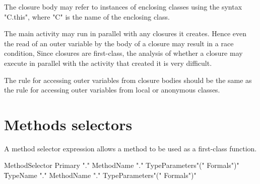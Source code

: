 The closure body may refer to instances of enclosing classes using
the syntax \xcd"C.this", where \xcd"C" is the name of the
enclosing class.

\begin{note}
The main activity may run in parallel with any
closures it creates. Hence even the read of an outer variable by the
body of a closure may result in a race condition, Since closures are
first-class, the analysis of whether a closure may execute in parallel
with the activity that created it is very difficult.
\end{note}

\begin{note}
The rule for accessing outer variables from closure bodies
should be the same as the rule for accessing outer variables from local
or anonymous classes.
\end{note}

\section{Methods selectors}
\label{MethodSelectors}

A method selector expression allows a method to be used as a
first-class function.

\begin{grammar}
MethodSelector \:
        Primary \xcd"."
        MethodName \xcd"."
                TypeParameters\opt \xcd"(" Formals\opt \xcd")" \\
      \|
        TypeName \xcd"."
        MethodName \xcd"."
                TypeParameters\opt \xcd"(" Formals\opt \xcd")" \\
\end{grammar}

